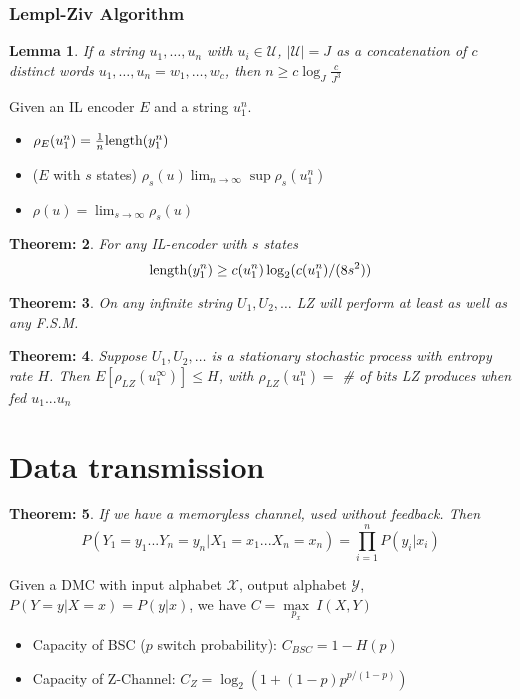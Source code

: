 \documentclass[11pt, a4paper]{scrartcl}
\newtheorem{theorem}{Theorem:}[section]
\newtheorem{lemma}[theorem]{Lemma}
\newenvironment{definition}[1][Definition]{\begin{trivlist}
\item[\hskip \labelsep {\bfseries #1}]}{\end{trivlist}}
\begin{document}
\subsubsection{Lempl-Ziv Algorithm}

\begin{lemma}
  If a string $u_1,\dots,u_n$ with $u_i\in \mathcal{U}$,
  $|\mathcal{U}|=J$ as a concatenation of $c$ \emph{distinct} words
  $u_1,\dots,u_n=w_1,\dots, w_c$, then $n\geq c\log_J\frac{c}{J^3}$
\end{lemma}

\begin{definition} [Compressibility of a string] Given an IL encoder 
$E$ and a string $u_1^n$.
\begin{itemize}
\item $\rho_E(u_1^n)=\frac{1}{n}\textnormal{length}(y_1^n)$
\item ($E$ with $s$ states) $\rho_s(u)\lim_{n \rightarrow \infty} \sup
  \rho_s(u_1^n)$
\item $\rho(u)=\lim_{s \rightarrow \infty}\rho_s(u)$
\end{itemize}
\end{definition}

\begin{theorem}
For any IL-encoder with $s$ states
$$\textnormal{length}(y_1^n)\geq c(u_1^n)\log_2(c(u_1^n)/(8s^2))$$
\end{theorem}

\begin{theorem}
On any infinite string $U_1, U_2, \dots$ LZ will perform at least as
well as any F.S.M.
\end{theorem}

\begin{theorem}
Suppose $U_1, U_2, \dots $ is a stationary stochastic process with
entropy rate $H$. Then $E[\rho_{LZ}(u_1^\infty)] \leq H$, with $\rho_{LZ}(u_1^n) =$ \# of bits LZ produces when fed $u_1... u_n$
\end{theorem}
\section{Data transmission}

\begin{theorem} If we have a memoryless channel, used without feedback. Then $$P(Y_1=y_1...Y_n=y_n|X_1=x_1...X_n=x_n) = \prod_{i=1}^n P(y_i|x_i)$$
\end{theorem}

\begin{definition} [Capacity] Given a DMC with input alphabet
  $\mathcal X$, output alphabet $\mathcal Y$, $P(Y=y|X=x) = P(y|x)$,
  we have $C=\underset{p_x}{\max}\ I(X,Y)$
  \begin{itemize}
  \item Capacity of BSC ($p$ switch probability): $C_{BSC} = 1 - H(p)$
  \item Capacity of Z-Channel: $C_Z= \log_2 (1+(1-p)p^{p/(1-p)})$
  \end{itemize}
\end{definition}
\end{document}
